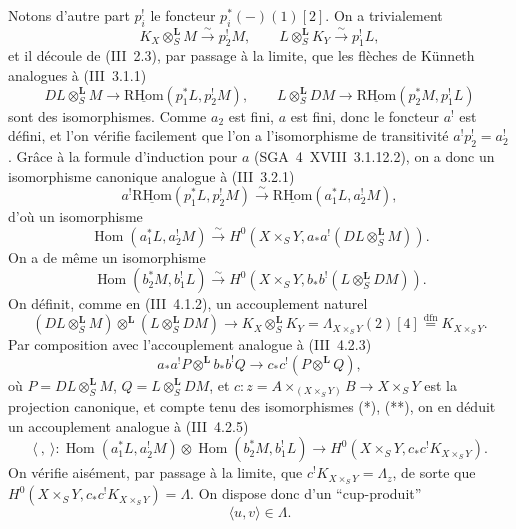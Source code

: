 \documentclass[11pt]{article}
\DeclareMathOperator{\Hom}{Hom}
\providecommand{\RHom}{\mathrm{RHom}}
\providecommand{\uRHom}{\underline{\RHom}}
\providecommand{\LL}{\mathbf L}
\providecommand{\RHom}{\mathrm{RHom}}
\providecommand{\Hom}{\operatorname{Hom}}
\providecommand{\RHom}{\mathrm R\mathcal{H}om}
\providecommand{\RHom}{\mathrm{RHom}}
\providecommand{\Hom}{\operatorname{Hom}}
\begin{document}
Notons d'autre part $p_i^!$ le foncteur $p_i^*(-)(1)[2]$. On a trivialement
\[
K_X\otimes_S^{\LL}M\xrightarrow{\sim}p_2^!M,
\qquad
L\otimes_S^{\LL}K_Y\xrightarrow{\sim}p_1^!L,
\]
et il découle de (III~2.3), par passage à la limite, que les flèches de Künneth analogues à (III~3.1.1)
\[
DL\otimes_S^{\LL}M\longrightarrow \uRHom(p_1^*L,p_2^!M),
\qquad
L\otimes_S^{\LL}DM\longrightarrow \uRHom(p_2^*M,p_1^!L)
\]
sont des isomorphismes. Comme $a_2$ est fini, $a$ est fini, donc le foncteur $a^!$ est défini, et l'on vérifie facilement que l'on a l'isomorphisme de transitivité $a^!p_2^!=a_2^!$. Grâce à la formule d'induction pour $a$ (SGA~4~XVIII~3.1.12.2), on a donc un isomorphisme canonique analogue à (III~3.2.1)
\[
a^!\uRHom(p_1^*L,p_2^!M)\xrightarrow{\sim}\uRHom(a_1^*L,a_2^!M),
\]
d'où un isomorphisme
\begin{equation}\tag{*}
\Hom(a_1^*L,a_2^!M)\xrightarrow{\sim}H^0(X\times_S Y,a_*a^!(DL\otimes_S^{\LL}M)).
\end{equation}
On a de même un isomorphisme
\begin{equation}\tag{**}
\Hom(b_2^*M,b_1^!L)\xrightarrow{\sim}H^0(X\times_S Y,b_*b^!(L\otimes_S^{\LL}DM)).
\end{equation}
On définit, comme en (III~4.1.2), un accouplement naturel
\[
(DL\otimes_S^{\LL}M)\otimes^{\LL}(L\otimes_S^{\LL}DM)
\longrightarrow K_X\otimes_S^{\LL}K_Y=\Lambda_{X\times_S Y}(2)[4]\stackrel{\mathrm{dfn}}{=}K_{X\times_S Y}.
\]
Par composition avec l'accouplement analogue à (III~4.2.3)
\[
a_*a^!P\otimes^{\LL} b_*b^!Q\longrightarrow c_*c^!(P\otimes^{\LL}Q),
\]
où $P=DL\otimes_S^{\LL}M$, $Q=L\otimes_S^{\LL}DM$, et $c:z=A\times_{(X\times_S Y)}B\to X\times_S Y$ est la projection canonique, et compte tenu des isomorphismes (*), (**), on en déduit un accouplement analogue à (III~4.2.5)
\[
\langle\ ,\ \rangle:\Hom(a_1^*L,a_2^!M)\otimes\Hom(b_2^*M,b_1^!L)
\longrightarrow H^0(X\times_S Y,c_*c^!K_{X\times_S Y}).
\]
On vérifie aisément, par passage à la limite, que $c^!K_{X\times_S Y}=\Lambda_z$, de sorte que $H^0(X\times_S Y,c_*c^!K_{X\times_S Y})=\Lambda$. On dispose donc d'un ``cup-produit''
\begin{equation}\tag{1.1.2}
\langle u,v\rangle\in\Lambda.
\end{equation}
\end{document}
